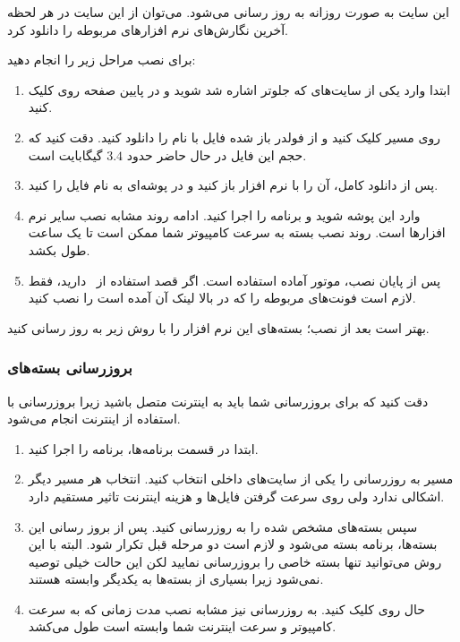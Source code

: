     این سایت به صورت روزانه به روز رسانی می‌شود. می‌توان از این سایت در هر 
    لحظه آخرین نگارش‌های نرم افزارهای مربوطه را دانلود کرد. 

    برای نصب   مراحل زیر را انجام دهید:
    \begin{enumerate}
    \item       
        ابتدا وارد یکی از سایت‌های که جلوتر اشاره شد 
     شوید و در پایین صفحه روی 
     کلیک کنید.
     \item
      روی مسیر  کلیک کنید و از فولدر باز شده فایل با نام 
     	را دانلود کنید. دقت کنید که حجم این فایل  در حال حاضر 
	    حدود $3.4$ گیگابایت است.
     \item
      پس از دانلود کامل، آن را با نرم افزار   باز کنید و در  پوشه‌ای به نام  فایل را  کنید.
     \item 
     وارد این پوشه شوید و برنامه 
     را اجرا کنید. ادامه روند مشابه نصب سایر نرم افزارها 
     است. روند نصب بسته به سرعت کامپیوتر شما ممکن است تا یک ساعت طول بکشد.

     \item
      پس از پایان نصب، موتور \lr{\TeX} آماده استفاده است. اگر قصد استفاده از \lr{\XePersian}
     \ دارید، فقط لازم است فونت‌های مربوطه را که در بالا لینک آن آمده است را نصب کنید.
    \end{enumerate}
    بهتر است بعد از نصب؛ بسته‌های این نرم افزار را با روش زیر به روز رسانی کنید.
    \subsubsection{بروزرسانی بسته‌های  }
    دقت کنید که برای بروزرسانی شما باید به اینترنت متصل باشید زیرا بروزرسانی با استفاده از اینترنت انجام می‌شود.
    \begin{enumerate}
    \item ابتدا در قسمت برنامه‌ها، برنامه  را اجرا کنید.
    \item 
        مسیر به روزرسانی را یکی از سایت‌های داخلی انتخاب کنید. انتخاب هر مسیر دیگر اشکالی ندارد ولی روی سرعت گرفتن فایل‌ها و هزینه اینترنت تاثیر مستقیم دارد. 
    \item 
        سپس بسته‌های مشخص شده را به روزرسانی کنید. پس از بروز رسانی این بسته‌ها، برنامه بسته می‌شود و لازم است دو مرحله قبل تکرار شود.
        البته با این روش می‌توانید تنها بسته خاصی را بروزرسانی نمایید لکن این حالت خیلی توصیه نمی‌شود زیرا بسیاری از بسته‌ها به یکدیگر وابسته هستند. 
    \item 
        حال روی  کلیک کنید. به روزرسانی نیز مشابه نصب مدت زمانی که به سرعت کامپیوتر و سرعت اینترنت شما وابسته است طول می‌کشد.
    \end{enumerate}

